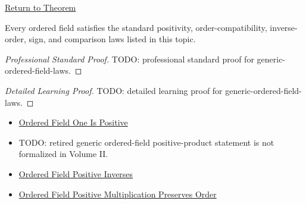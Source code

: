 \newpage
{}
\label{prf:generic-ordered-field-laws}

\begin{remark*}[Return]
\hyperref[cor:generic-ordered-field-laws]{Return to Theorem}
\end{remark*}

\begin{corollary*}
Every ordered field satisfies the standard positivity, order-compatibility,
inverse-order, sign, and comparison laws listed in this topic.
\end{corollary*}

\begin{proof}[Professional Standard Proof]
\LRAProofBodyStart
TODO: professional standard proof for generic-ordered-field-laws.
\end{proof}

\begin{proof}[Detailed Learning Proof]
\LRAProofBodyStart
TODO: detailed learning proof for generic-ordered-field-laws.
\end{proof}

\begin{remark*}
\end{remark*}

\begin{dependencies}
\begin{itemize}
  \item \hyperref[def:one-in-q]{Ordered Field One Is Positive}
  \item TODO: retired generic ordered-field positive-product statement is not formalized in Volume II.
  \item \hyperref[thm:reciprocal-reverses-order-on-positives-q]{Ordered Field Positive Inverses}
  \item \hyperref[thm:ordered-field-positive-multiplication-preserves-order]{Ordered Field Positive Multiplication Preserves Order}
\end{itemize}
\end{dependencies}

\clearpage

